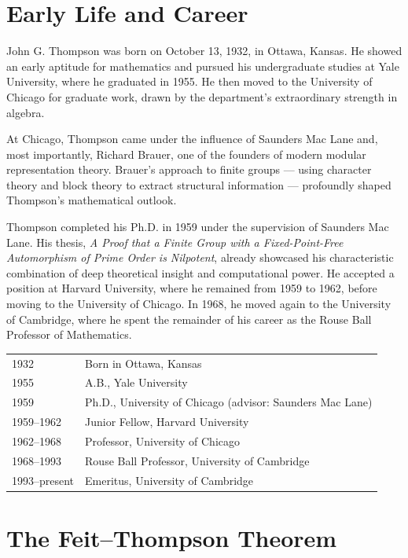 \section{Early Life and Career}

John G. Thompson was born on October 13, 1932, in Ottawa, Kansas. He showed an early aptitude for mathematics and pursued his undergraduate studies at Yale University, where he graduated in 1955. He then moved to the University of Chicago for graduate work, drawn by the department's extraordinary strength in algebra.

At Chicago, Thompson came under the influence of Saunders Mac Lane and, most importantly, Richard Brauer, one of the founders of modern modular representation theory. Brauer's approach to finite groups --- using character theory and block theory to extract structural information --- profoundly shaped Thompson's mathematical outlook.

Thompson completed his Ph.D. in 1959 under the supervision of Saunders Mac Lane. His thesis, \textit{A Proof that a Finite Group with a Fixed-Point-Free Automorphism of Prime Order is Nilpotent}, already showcased his characteristic combination of deep theoretical insight and computational power. He accepted a position at Harvard University, where he remained from 1959 to 1962, before moving to the University of Chicago. In 1968, he moved again to the University of Cambridge, where he spent the remainder of his career as the Rouse Ball Professor of Mathematics.

\begin{center}
\begin{tabular}{l l}
1932 & Born in Ottawa, Kansas \\
1955 & A.B., Yale University \\
1959 & Ph.D., University of Chicago (advisor: Saunders Mac Lane) \\
1959--1962 & Junior Fellow, Harvard University \\
1962--1968 & Professor, University of Chicago \\
1968--1993 & Rouse Ball Professor, University of Cambridge \\
1993--present & Emeritus, University of Cambridge \\
\end{tabular}
\end{center}

\section{The Feit--Thompson Theorem}


